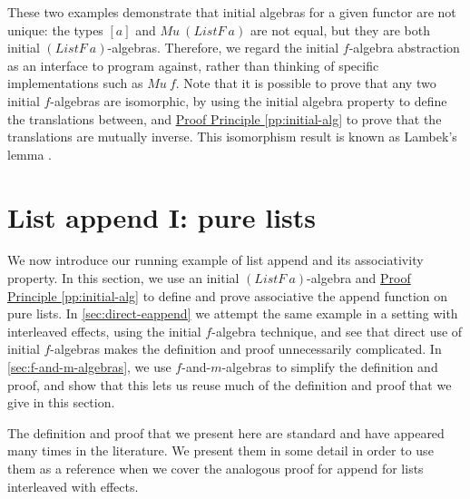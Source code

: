 \documentclass{jfp1}
\newcommand{\proofprinref}[1]{\hyperref[#1]{Proof Principle \ref*{#1}}}
\begin{document}
These two examples demonstrate that initial algebras for a given
functor are not unique: the types $[a]$ and
$\mathit{Mu}~(\mathit{ListF}~a)$ are not equal, but they are both
initial $(\mathit{ListF}~a)$-algebras. Therefore, we regard the
initial $f$-algebra abstraction as an interface to program against,
rather than thinking of specific implementations such as
$\mathit{Mu}~f$. Note that it is possible to prove that any two
initial $f$-algebras are isomorphic, by using the initial algebra
property to define the translations between, and
\proofprinref{pp:initial-alg} to prove that the translations are
mutually inverse. This isomorphism result is known as Lambek's lemma
\cite{LAMBEK68}.

\section{List append I: pure lists}
\label{sec:pure-append}

We now introduce our running example of list append and its
associativity property. In this section, we use an initial
$(\mathit{ListF}~a)$-algebra and \proofprinref{pp:initial-alg} to
define and prove associative the append function on pure lists. In
\autoref{sec:direct-eappend} we attempt the same example in a setting
with interleaved effects, using the initial $f$-algebra technique, and
see that direct use of initial $f$-algebras makes the definition and
proof unnecessarily complicated. In \autoref{sec:f-and-m-algebras}, we
use $f$-and-$m$-algebras to simplify the definition and proof, and
show that this lets us reuse much of the definition and proof that we
give in this section.

The definition and proof that we present here are standard and have
appeared many times in the literature. We present them in some detail
in order to use them as a reference when we cover the analogous proof
for append for lists interleaved with effects.
\end{document}
